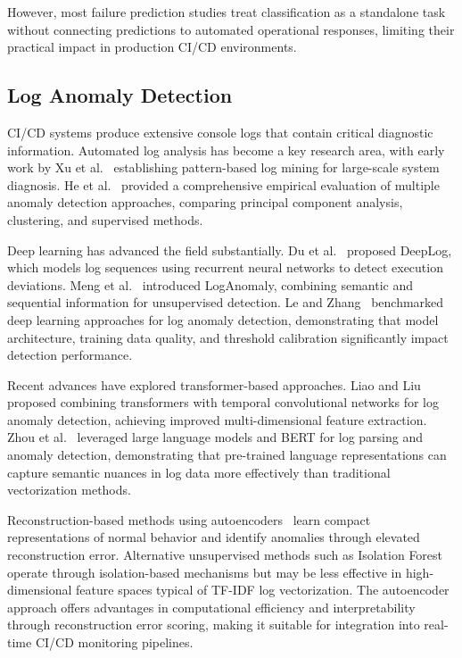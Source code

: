\documentclass[sn-nature]{sn-jnl}
\theoremstyle{thmstyleone}
\theoremstyle{thmstyletwo}
\theoremstyle{thmstylethree}
\begin{document}
However, most failure prediction studies treat classification as a standalone task without connecting predictions to automated operational responses, limiting their practical impact in production CI/CD environments.

\subsection{Log Anomaly Detection}\label{subsec:loganomalyrelated}

CI/CD systems produce extensive console logs that contain critical diagnostic information. Automated log analysis has become a key research area, with early work by Xu et al.~\cite{xu2009logmining} establishing pattern-based log mining for large-scale system diagnosis. He et al.~\cite{he2016experience} provided a comprehensive empirical evaluation of multiple anomaly detection approaches, comparing principal component analysis, clustering, and supervised methods.

Deep learning has advanced the field substantially. Du et al.~\cite{du2017deeplog} proposed DeepLog, which models log sequences using recurrent neural networks to detect execution deviations. Meng et al.~\cite{meng2019loganomaly} introduced LogAnomaly, combining semantic and sequential information for unsupervised detection. Le and Zhang~\cite{le2022log} benchmarked deep learning approaches for log anomaly detection, demonstrating that model architecture, training data quality, and threshold calibration significantly impact detection performance.

Recent advances have explored transformer-based approaches. Liao and Liu~\cite{liao2025logtransformer} proposed combining transformers with temporal convolutional networks for log anomaly detection, achieving improved multi-dimensional feature extraction. Zhou et al.~\cite{zhou2024logllm} leveraged large language models and BERT for log parsing and anomaly detection, demonstrating that pre-trained language representations can capture semantic nuances in log data more effectively than traditional vectorization methods.

Reconstruction-based methods using autoencoders~\cite{sakurada2014anomaly} learn compact representations of normal behavior and identify anomalies through elevated reconstruction error. Alternative unsupervised methods such as Isolation Forest~\cite{liu2008isolation} operate through isolation-based mechanisms but may be less effective in high-dimensional feature spaces typical of TF-IDF log vectorization. The autoencoder approach offers advantages in computational efficiency and interpretability through reconstruction error scoring, making it suitable for integration into real-time CI/CD monitoring pipelines.
\end{document}
